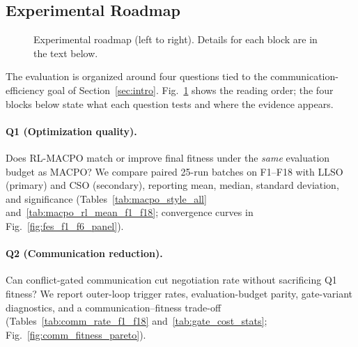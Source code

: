 \documentclass[conference]{IEEEtran}
\begin{document}
\subsection{Experimental Roadmap}\label{sec:exp_roadmap}

\begin{figure}[!t]
\centering
{}
\caption{Experimental roadmap (left to right). Details for each block are in the text below.}
\label{fig:exp_roadmap}
\end{figure}


The evaluation is organized around four questions tied to the communication-efficiency goal of Section~\ref{sec:intro}. Fig.~\ref{fig:exp_roadmap} shows the reading order; the four blocks below state what each question tests and where the evidence appears.

\paragraph{Q1 (Optimization quality).}
Does RL-MACPO match or improve final fitness under the \emph{same} evaluation budget as MACPO? We compare paired 25-run batches on F1--F18 with LLSO (primary) and CSO (secondary), reporting mean, median, standard deviation, and significance (Tables~\ref{tab:macpo_style_all} and~\ref{tab:macpo_rl_mean_f1_f18}; convergence curves in Fig.~\ref{fig:fes_f1_f6_panel}).

\paragraph{Q2 (Communication reduction).}
Can conflict-gated communication cut negotiation rate without sacrificing Q1 fitness? We report outer-loop trigger rates, evaluation-budget parity, gate-variant diagnostics, and a communication--fitness trade-off (Tables~\ref{tab:comm_rate_f1_f18} and~\ref{tab:gate_cost_stats}; Fig.~\ref{fig:comm_fitness_pareto}).
\end{document}
